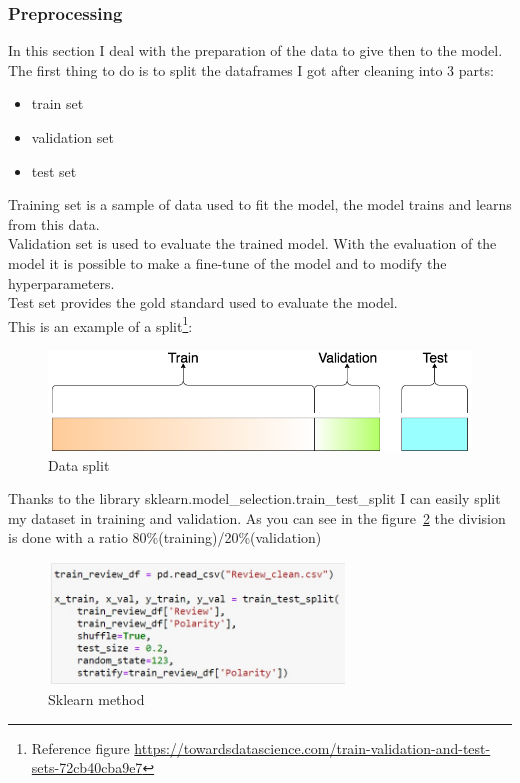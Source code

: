 \subsubsection{Preprocessing}
In this section I deal with the preparation of the data to give then to the model.
The first thing to do is to split the dataframes I got after cleaning into 3 parts:
\begin{itemize}
    \item train set
    \item validation set
    \item test set
\end{itemize}

Training set is a sample of data used to fit the model, the model trains and learns from this data.\\
Validation set is used to evaluate the trained model. With the evaluation of the model it is possible to make a fine-tune of the model and to modify the hyperparameters.\\
Test set provides the gold standard used to evaluate the model.\\
\newpage
This is an example of a split\footnote{Reference figure \url{https://towardsdatascience.com/train-validation-and-test-sets-72cb40cba9e7}}: 
\begin{figure}[H]
\centering
\includegraphics[width=1\textwidth]{images/traintestvali.jpg}
\caption{Data split}
\label{fig:fig_05}
\end{figure}
\FloatBarrier

Thanks to the library sklearn.model\_selection.train\_test\_split I can easily split my dataset in training and validation. As you can see in the figure~\ref{fig:fig_06} the division is done with a ratio 80\%(training)/20\%(validation)

\begin{figure}[H]
\centering
\includegraphics[width=0.7\textwidth]{images/traintest.jpg}
\caption{Sklearn method}
\label{fig:fig_06}
\end{figure}
\FloatBarrier

